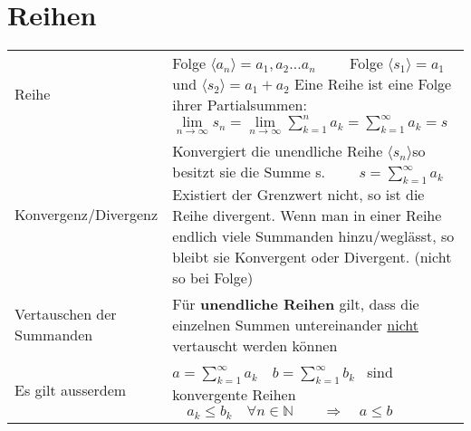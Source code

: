 \clearpage

\begin{table}[h!]
\section{Reihen}

\begin{center}

\begin{tabularx}{\textwidth}{|p{100pt}|X|}
\hline
\rowcolor{Gray}
\multicolumn{2}{|c|}{\textbf{Grundlegendes}}\\
\hline
	Reihe & 
	Folge $\langle a_n \rangle = a_1,a_2...a_n \qquad$
	Folge $\langle s_1\rangle = a_1$ und $\langle s_2 \rangle = a_1+a_2$\newline
	Eine Reihe ist eine Folge ihrer Partialsummen: \quad $\lim\limits_{n\to\infty} s_n  =  \lim\limits_{n\to\infty}\sum\limits_{k=1}^{n}a_k = \sum\limits_{k=1}^{\infty}a_k = s$\\
\hline
	Konvergenz/Divergenz &
	Konvergiert die unendliche Reihe $\langle s_n\rangle $so besitzt sie die Summe s. $\qquad
	s=\sum\limits_{k=1}^{\infty} a_k$\newline
	Existiert der Grenzwert nicht, so ist die Reihe divergent.\newline
	Wenn man in einer Reihe endlich viele Summanden hinzu/weglässt, so bleibt sie Konvergent oder Divergent. (nicht so bei Folge)\\
\hline
	Vertauschen \newline der Summanden &
	Für \textbf{unendliche Reihen} gilt, dass die einzelnen Summen untereinander \underline{nicht} vertauscht werden können\\
\hline
	Es gilt ausserdem&
	$a=\sum\limits_{k=1}^{\infty} a_k \quad b=\sum\limits_{k=1}^{\infty} b_k$ \ sind konvergente Reihen $\quad a_k \leq b_k\quad \forall n\in \mathbb{N} \qquad \Rightarrow \quad a\leq b$\\
	\hline
\end{tabularx}


\end{center}
\end{table}
